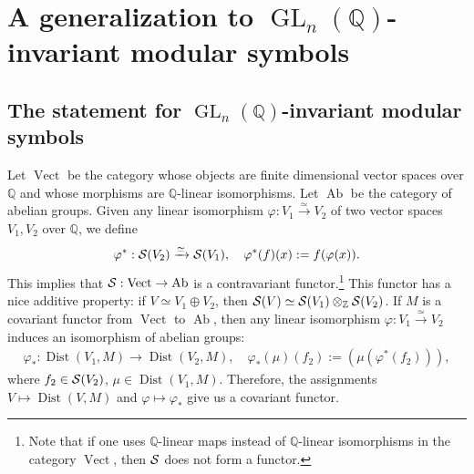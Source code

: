 \documentclass[12pt,amstex,amssymb]{article}
\theoremstyle{plain}
\theoremstyle{definition}
\newtheorem{definition}[theorem]{Definition}
\def\cS{{\cal S}}
\def\Z{{\mathbb Z}}
\def\Q{{\mathbb Q}}
\newcommand{\bea}{\begin{eqnarray}}
\newcommand{\eea}{\end{eqnarray}}
\newcommand{\GL}{\operatorname{GL}}
\newcommand{\Dist}{\operatorname{Dist}}
\begin{document}
\section{A generalization to $\GL_n(\Q)$-invariant modular symbols}\label{glngeneral}




\subsection{The statement for $\GL_n(\Q)$-invariant modular symbols}




Let $\operatorname{Vect}$ be the category whose objects are finite dimensional vector spaces over $\Q$ and whose morphisms are $\Q$-linear isomorphisms.
Let $\operatorname{Ab}$ be the category of abelian groups.
Given any linear isomorphism $\varphi:V_1 \xrightarrow{\simeq} V_2$ of two vector spaces $V_1, V_2$ over $\Q$, we define
\bea \label{test}
\varphi^*: \cS(V_2) \xrightarrow{\simeq} \cS(V_1), \quad \varphi^* (f) (x) := f(\varphi(x)).
\eea
This implies that $\cS: \operatorname{Vect} \to \operatorname{Ab}$ is a contravariant functor.\footnote{Note that if one uses $\Q$-linear maps instead of $\Q$-linear isomorphisms in the category $\operatorname{Vect}$, then $\cS$ does not form a functor.} This functor has a nice additive property: if $V\simeq V_1\oplus V_2$, then $\cS(V)\simeq \cS(V_1) \otimes_\Z \cS(V_2)$.
If $M$ is a covariant functor from $\operatorname{Vect}$ to $\operatorname{Ab}$, then any linear isomorphism $\varphi:V_1\xrightarrow{\simeq} V_2$ induces an isomorphism of abelian groups:
\bea \label{indcov}
\varphi_*: \operatorname{\Dist}(V_1, M) \to \operatorname{\Dist}(V_2, M), \quad \varphi_*(\mu) (f_2)
:=\left( \mu(\varphi^*(f_2)) \right),
\eea
where $f_2 \in \cS(V_2)$, $\mu\in \operatorname{\Dist}(V_1, M)$.
Therefore, the assignments $V \mapsto \operatorname{\Dist}(V, M)$ and $\varphi \mapsto \varphi_*$ give us a covariant functor.
\end{document}
